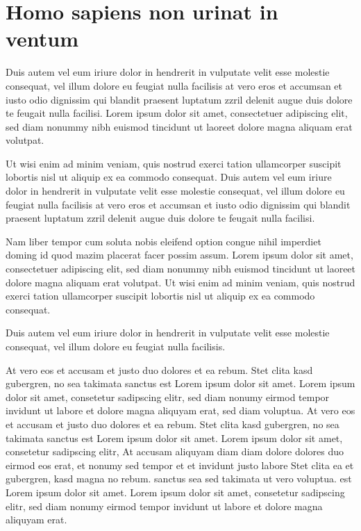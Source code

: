\documentclass[12pt,a4paper,twoside]{report}
\begin{document}
\section{Homo sapiens non urinat in ventum}
Duis autem vel eum iriure dolor in hendrerit in vulputate velit esse
molestie consequat, vel illum dolore eu feugiat nulla facilisis at
vero eros et accumsan et iusto odio dignissim qui blandit praesent
luptatum zzril delenit augue duis dolore te feugait nulla facilisi.
Lorem ipsum dolor sit amet, consectetuer adipiscing elit, sed diam
nonummy nibh euismod tincidunt ut laoreet dolore magna aliquam erat
volutpat.

Ut wisi enim ad minim veniam, quis nostrud exerci tation ullamcorper
suscipit lobortis nisl ut aliquip ex ea commodo consequat. Duis autem
vel eum iriure dolor in hendrerit in vulputate velit esse molestie
consequat, vel illum dolore eu feugiat nulla facilisis at vero eros et
accumsan et iusto odio dignissim qui blandit praesent luptatum zzril
delenit augue duis dolore te feugait nulla facilisi.

Nam liber tempor cum soluta nobis eleifend option congue nihil
imperdiet doming id quod mazim placerat facer possim assum. Lorem
ipsum dolor sit amet, consectetuer adipiscing elit, sed diam nonummy
nibh euismod tincidunt ut laoreet dolore magna aliquam erat volutpat.
Ut wisi enim ad minim veniam, quis nostrud exerci tation ullamcorper
suscipit lobortis nisl ut aliquip ex ea commodo consequat.

Duis autem vel eum iriure dolor in hendrerit in vulputate velit esse
molestie consequat, vel illum dolore eu feugiat nulla facilisis.

At vero eos et accusam et justo duo dolores et ea rebum. Stet clita
kasd gubergren, no sea takimata sanctus est Lorem ipsum dolor sit
amet. Lorem ipsum dolor sit amet, consetetur sadipscing elitr, sed
diam nonumy eirmod tempor invidunt ut labore et dolore magna aliquyam
erat, sed diam voluptua. At vero eos et accusam et justo duo dolores
et ea rebum. Stet clita kasd gubergren, no sea takimata sanctus est
Lorem ipsum dolor sit amet. Lorem ipsum dolor sit amet, consetetur
sadipscing elitr, At accusam aliquyam diam diam dolore dolores duo
eirmod eos erat, et nonumy sed tempor et et invidunt justo labore Stet
clita ea et gubergren, kasd magna no rebum. sanctus sea sed takimata
ut vero voluptua. est Lorem ipsum dolor sit amet. Lorem ipsum dolor
sit amet, consetetur sadipscing elitr, sed diam nonumy eirmod tempor
invidunt ut labore et dolore magna aliquyam erat.
\end{document}
